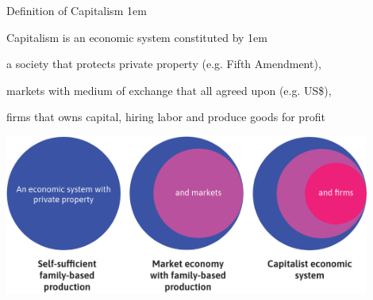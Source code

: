 \documentclass[11pt,aspectratio=43,usenames,dvipsnames]{beamer}
\let\olditemize=\itemize
\let\endolditemize=\enditemize
\renewenvironment{itemize}{\olditemize \itemsep1em}{\endolditemize}
\let\oldenumerate=\enumerate
\let\endoldenumerate=\endenumerate
\renewenvironment{enumerate}{\oldenumerate \itemsep1em}{ \endoldenumerate}
\theoremstyle{definition}
\begin{document}
\begin{frame}{Definition of Capitalism}
\label{slide:Definition_of_Capitalism}
    \begin{itemize}
        \item Capitalism is an \alert{economic system} constituted by
        \begin{enumerate}
            \item a society that protects private property (e.g. Fifth Amendment),
            \item markets with medium of exchange that all agreed upon (e.g. US\$),
            \item firms that owns capital, hiring labor and produce goods for profit
        \end{enumerate}
    \end{itemize}

    \begin{center}
        \includegraphics[width=0.9\textwidth]{./figures/Figure1_8.png}
    \end{center}

\end{frame}
\end{document}
